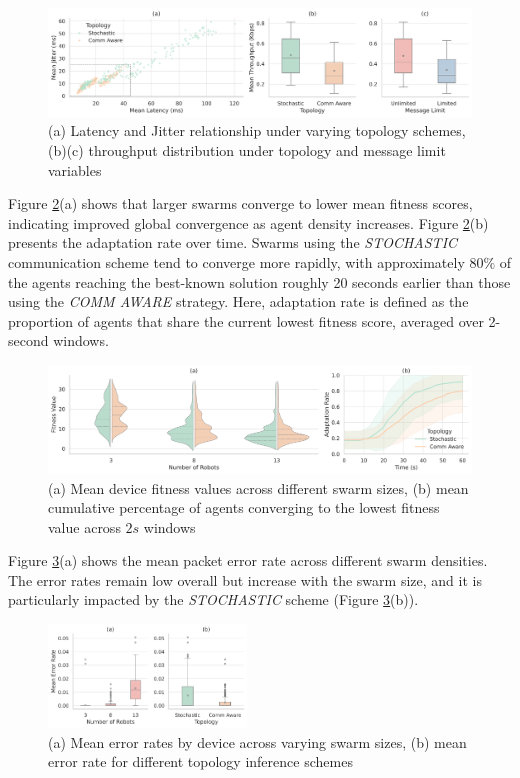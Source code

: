 \documentclass[conference]{IEEEtran}
\begin{document}
\begin{figure}[h]
    \centering
    \includegraphics[width=1\textwidth]{topology_impact.pdf}
    \caption{(a) Latency and Jitter relationship under varying topology schemes, (b)(c) throughput distribution under topology and message limit variables}
    \label{fig:topology}
\end{figure}

Figure \ref{fig:performance}(a) shows that larger swarms converge to lower mean fitness scores, indicating improved global convergence as agent density increases. Figure \ref{fig:performance}(b) presents the adaptation rate over time. Swarms using the \emph{STOCHASTIC} communication scheme tend to converge more rapidly, with approximately $80\%$ of the agents reaching the best-known solution roughly 20 seconds earlier than those using the \emph{COMM AWARE} strategy. Here, adaptation rate is defined as the proportion of agents that share the current lowest fitness score, averaged over 2-second windows.

\begin{figure}[h]
    \centering
    \includegraphics[width=1\textwidth]{performance_impact.pdf}
    \caption{(a) Mean device fitness values across different swarm sizes, (b) mean cumulative percentage of agents converging to the lowest fitness value across $2s$ windows}
    \label{fig:performance}
\end{figure}

Figure \ref{fig:error-rates}(a) shows the mean packet error rate across different swarm densities. The error rates remain low overall but increase with the swarm size, and it is particularly impacted by the \emph{STOCHASTIC} scheme (Figure \ref{fig:error-rates}(b)).

\begin{figure}[H]
    \centering
    \includegraphics[width=0.47\textwidth]{reliability_impact.pdf}
    \caption{(a) Mean error rates by device across varying swarm sizes, (b) mean error rate for different topology inference schemes}
    \label{fig:error-rates}
\end{figure}
\end{document}
